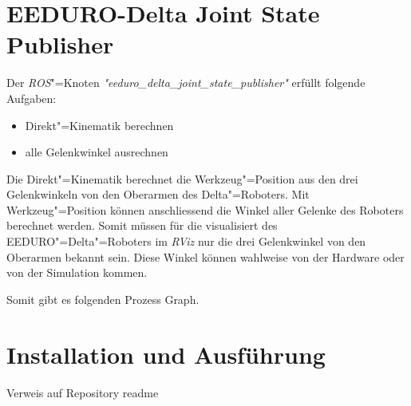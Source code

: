 \section{EEDURO-Delta Joint State Publisher}
Der \textit{ROS}"=Knoten \textit{\textit{"}eeduro\_delta\_joint\_state\_publisher\textit{"}} erfüllt folgende Aufgaben:
\begin{itemize}
\item Direkt"=Kinematik berechnen
\item alle Gelenkwinkel ausrechnen
\end{itemize}
Die Direkt"=Kinematik berechnet die Werkzeug"=Position aus den drei Gelenkwinkeln von den Oberarmen des Delta"=Roboters.
Mit Werkzeug"=Position können anschliessend die Winkel aller Gelenke des Roboters berechnet werden.
Somit müssen für die visualisiert des EEDURO"=Delta"=Roboters im \textit{RViz} nur die drei Gelenkwinkel von den Oberarmen bekannt sein.
Diese Winkel können wahlweise von der Hardware oder von der Simulation kommen.



Somit gibt es folgenden Prozess Graph.




\section{Installation und Ausführung}
Verweis auf Repository readme